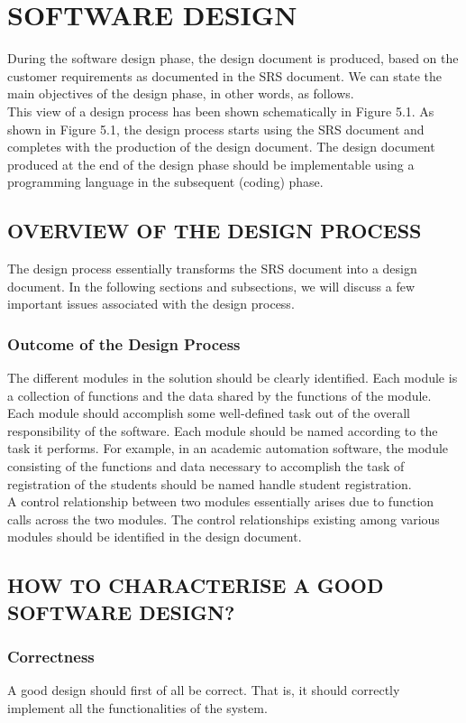 \documentclass[12pt]{article}
\begin{document}
\section{SOFTWARE DESIGN}
During the software design phase, the design document is produced, based
on the customer requirements as documented in the SRS document. We can
state the main objectives of the design phase, in other words, as follows.\\

This view of a design process has been shown schematically in Figure 5.1.
As shown in Figure 5.1, the design process starts using the SRS document and
completes with the production of the design document. The design document
produced at the end of the design phase should be implementable using a
programming language in the subsequent (coding) phase.
\subsection{OVERVIEW OF THE DESIGN PROCESS}
The design process essentially transforms the SRS document into a
design document. In the following sections and subsections, we will
discuss a few important issues associated with the design process.
\subsubsection{Outcome of the Design Process}
The different modules in the solution should
be clearly identified. Each module is a collection of functions and the data
shared by the functions of the module. Each module should accomplish some
well-defined task out of the overall responsibility of the software. Each
module should be named according to the task it performs. For example, in
an academic automation software, the module consisting of the functions and
data necessary to accomplish the task of registration of the students should
be named handle student registration.\\

A control relationship between
two modules essentially arises due to function calls across the two modules.
The control relationships existing among various modules should be identified
in the design document.

\subsection{HOW TO CHARACTERISE A GOOD SOFTWARE DESIGN?}
\subsubsection{Correctness}
A good design should first of all be correct. That is, it should
correctly implement all the functionalities of the system.
\end{document}
